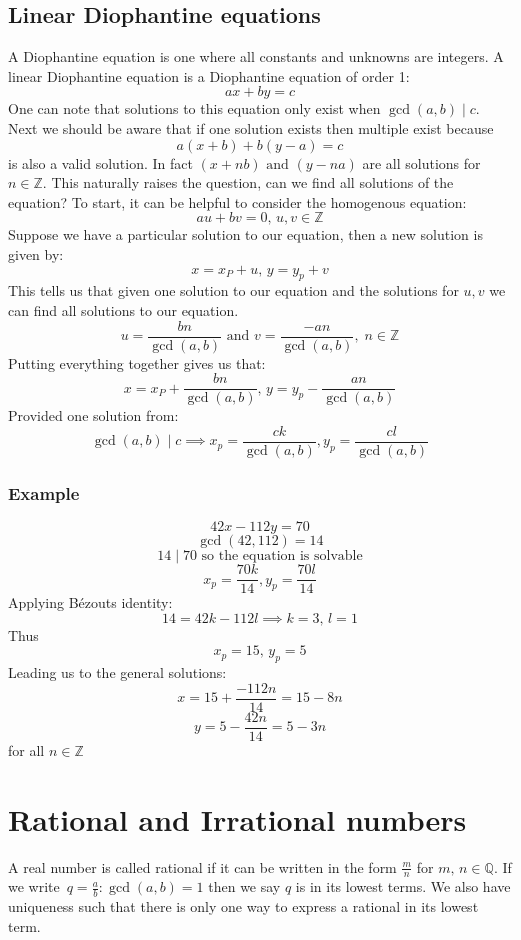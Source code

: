 \documentclass[12pt]{article}
\newcommand{\rational}{\in\mathbb{Q}}
\begin{document}
\subsection*{Linear Diophantine equations}
A Diophantine equation is one where all constants and unknowns are integers. A linear Diophantine equation is a Diophantine equation of order 1:
\[ax+by=c\]
One can note that solutions to this equation only exist when \(\gcd(a,b) \mid c\). Next we should be aware that if one solution exists then multiple exist because
\[a(x+b)+b(y-a)=c\]
is also a valid solution. In fact \((x+nb)\text{ and }(y-na)\) are all solutions for \(n\in\mathbb{Z}\). This naturally raises the question, can we find all solutions of the equation? To start, it can be helpful to consider the homogenous equation:
\[au+bv=0,\,u,v\in\mathbb{Z}\]
Suppose we have a particular solution to our equation, then a new solution is given by:
\[x=x_P+u,\,y=y_p+v\]
This tells us that given one solution to our equation and the solutions for \(u,v\) we can find all solutions to our equation.
\[u=\frac{bn}{\gcd(a,b)} \text{ and }v=\frac{-an}{\gcd(a,b)},\; n\in\mathbb{Z}\]
Putting everything together gives us that:
\[x=x_P+\frac{bn}{\gcd(a,b)},\,y=y_p-\frac{an}{\gcd(a,b)}\]
Provided one solution from:
\[\gcd(a,b)\mid c\implies x_p=\frac{ck}{\gcd(a,b)},y_p=\frac{cl}{\gcd(a,b)}\]
\subsubsection*{Example}
\[42x-112y=70\]
\[\gcd(42,112)=14\]
\[14\mid70 \text{ so the equation is solvable}\]
\[x_p=\frac{70k}{14}, y_p=\frac{70l}{14}\]
Applying B\'ezouts identity:
\[14=42k-112l\implies k=3,\,l=1\]
Thus
\[x_p=15,\,y_p=5\]
Leading us to the general solutions:
\[x=15+\frac{-112n}{14}=15-8n\]
\[y=5-\frac{42n}{14}=5-3n\]
for all \(n\in\mathbb{Z}\)
\section{Rational and Irrational numbers}
A real number is called rational if it can be written in the form \(\frac{m}{n}\) for \(m,\,n\rational\). If we write \(\,q=\frac{a}{b}:\gcd(a,b)=1\) then we say \(q\) is in its lowest terms. We also have uniqueness such that there is only one way to express a rational in its lowest term.
\end{document}
